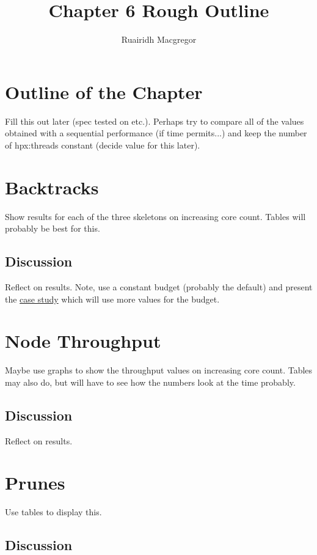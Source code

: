 \documentclass[11pt,a4paper]{article}
\title{Chapter 6 Rough Outline}
\author{Ruairidh Macgregor}
\date{}
\begin{document}
\maketitle

\section{Outline of the Chapter}

Fill this out later (spec tested on etc.). Perhaps try to compare all of the values obtained with a sequential performance (if time permits...) and
keep the number of hpx:threads constant (decide value for this later).

\section{Backtracks}

Show results for each of the three skeletons on increasing core count. Tables will probably be best for this.

\subsection{Discussion}

Reflect on results. Note, use a constant budget (probably the default) and present the \hyperref[sec:budget]{case study} which will use more values for the budget.

\section{Node Throughput}

Maybe use graphs to show the throughput values on increasing core count. Tables may also do, but will have to see how the numbers look at the time probably.

\subsection{Discussion}

Reflect on results.

\section{Prunes}

Use tables to display this.

\subsection{Discussion}
\end{document}
